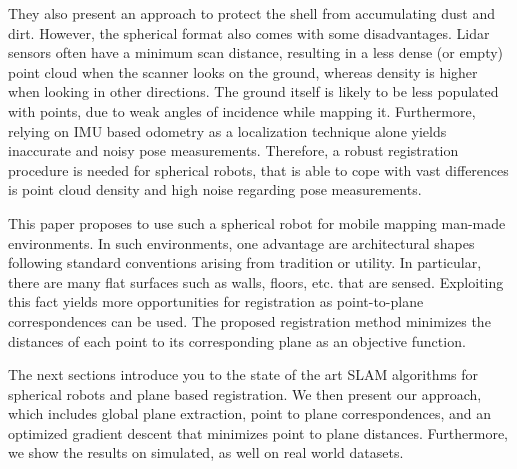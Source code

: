 They also present an approach to protect the shell from accumulating dust and dirt.
However, the spherical format also comes with some disadvantages.
Lidar sensors often have a minimum scan distance, resulting in a less dense (or empty) point cloud when the scanner looks on the ground, whereas density is higher when looking in other directions.
The ground itself is likely to be less populated with points, due to weak angles of incidence while mapping it.
Furthermore, relying on IMU based odometry as a localization technique alone yields inaccurate and noisy pose measurements.
Therefore, a robust registration procedure is needed for spherical robots, that is able to cope with vast differences is point cloud density and high noise regarding pose measurements.

This paper proposes to use such a spherical robot for mobile mapping man-made environments.
In such environments, one advantage are architectural shapes following standard conventions arising from tradition or utility. In particular, there are many flat surfaces such as walls, floors, etc. that are sensed.
Exploiting this fact yields more opportunities for registration as point-to-plane correspondences can be used.
The proposed registration method minimizes the distances of each point to its corresponding plane as an objective function.

The next sections introduce you to the state of the art SLAM algorithms for spherical robots and plane based registration.
We then present our approach, which includes global plane extraction, point to plane correspondences, and an optimized gradient descent that minimizes point to plane distances.
Furthermore, we show the results on simulated, as well on real world datasets. 
